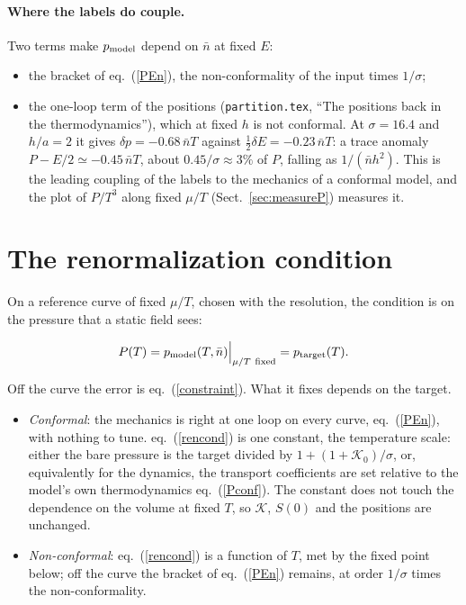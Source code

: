 \documentclass[11pt,aps,preprint,nofootinbib,superscriptaddress,tightenlines]{revtex4-2}
\def\st{\begin{equation}}
\def\stp{\end{equation}}
\def\Eq#1{eq.~(\ref{#1})}
\def\Sect#1{Sect.~\ref{#1}}
\let\oldparagraph\paragraph
\renewcommand{\paragraph}{\par\bigskip\oldparagraph}
\begin{document}
\paragraph{Where the labels do couple.}  Two terms make $p_{\rm model}$ depend on $\bar n$ at fixed $E$:
\begin{itemize}
\item the bracket of \Eq{PEn}, the non-conformality of the input times $1/\sigma$;
\item the one-loop term of the positions (\texttt{partition.tex}, ``The positions back in the thermodynamics''), which at fixed $h$ is not conformal.  At $\sigma=16.4$ and $h/a=2$ it gives $\delta p=-0.68\,\bar nT$
  against $\tfrac12\delta E=-0.23\,\bar nT$: a trace anomaly $P-E/2\simeq-0.45\,\bar nT$, about $0.45/\sigma\approx3\%$ of $P$, falling as $1/(\bar nh^2)$.  This is the
  leading coupling of the labels to the mechanics of a conformal model, and the plot of $P/T^3$ along fixed $\mu/T$ (\Sect{sec:measureP}) measures it.
\end{itemize}

\section{The renormalization condition}
\label{sec:dial}

On a reference curve of fixed $\mu/T$, chosen with the resolution, the condition is on the pressure that a static field sees:
\begin{keyeq}
\st
P(T)=p_{\rm model}(T,\bar n)\Big|_{\mu/T\ \text{fixed}}=p_{\rm target}(T) .
\label{rencond}
\stp
\end{keyeq}
Off the curve the error is \Eq{constraint}.  What it fixes depends on the target.
\begin{itemize}
\item \emph{Conformal}: the mechanics is right at one loop on every curve, \Eq{PEn}, with nothing to tune.  \Eq{rencond} is one constant, the temperature scale:
  either the bare pressure is the target divided by $1+(1+\mathcal K_0)/\sigma$, or, equivalently for the dynamics, the transport coefficients are set relative to
  the model's own thermodynamics \Eq{Pconf}.  The constant does not touch the dependence on the volume at fixed $T$, so $\mathcal K$, $S(0)$ and the positions are
  unchanged.
\item \emph{Non-conformal}: \Eq{rencond} is a function of $T$, met by the fixed point below; off the curve the bracket of \Eq{PEn} remains, at order
  $1/\sigma$ times the non-conformality.
\end{itemize}
\end{document}
